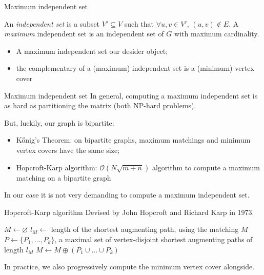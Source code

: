 \begin{frame}{Maximum independent set}
 \begin{definition}
		An \emph{independent set} is a subset $V' \subseteq V$ such that $ \forall u,v \in V'$, $(u,v) \notin E$.
	A \emph{maximum} independent set is an independent set of $G$ with maximum cardinality. 
 \end{definition}

\begin{itemize}
	\item A maximum independent set our desider object;
	\item the complementary of a (maximum) independent set is a (minimum) vertex cover
\end{itemize}

\end{frame}

\begin{frame}{Maximum independent set}
	In general, computing a maximum independent set is as hard as partitioning the matrix (both NP-hard problems).

But, luckily, our graph is bipartite:

	\begin{itemize}
		\item K\H{o}nig's Theorem: on bipartite graphs, maximum matchings and minimum vertex covers have the same size;
		\item Hopcroft-Karp algorithm: $\mathcal{O}\left(N\sqrt{m+n}\right)$ algorithm to compute a maximum matching on a bipartite graph
	\end{itemize}

In our case it is not very demanding to compute a maximum independent set.

\end{frame}

\begin{frame}{Hopcroft-Karp algorithm}
Devised by John Hopcroft and Richard Karp in 1973.

\begin{algorithm}[H]
	\footnotesize 
	\begin{algorithmic}
		\State $M \gets \varnothing$
		\Repeat
		\State $l_M \gets$ length of the shortest augmenting path, using the matching $M$
		\State $P \gets \{ P_1,\dots,P_k \}$, a maximal set of vertex-disjoint shortest augmenting paths of length $l_M$
		\State $M \gets M \oplus (P_1 \cup \dots \cup P_k )$
	\end{algorithmic}
\end{algorithm}

In practice, we also progressively compute the minimum vertex cover alongside.

\end{frame}

